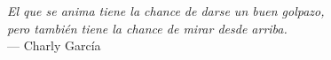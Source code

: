 \begin{flushright}
\textit{El que se anima tiene la chance de darse un buen golpazo, \\
pero también tiene la chance de mirar desde arriba.} \\
--- Charly García
\end{flushright}